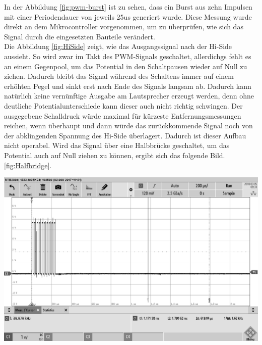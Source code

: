 In der Abbildung \ref{fig:pwm-burst} ist zu sehen, dass ein Burst aus zehn Impulsen mit einer Periodendauer von jeweils 25us generiert wurde. Diese Messung wurde direkt an dem Mikrocontroller vorgenommen, um zu überprüfen, wie sich das Signal durch die eingesetzten Bauteile verändert.\\
Die Abbildung \ref{fig:HiSide} zeigt, wie das Ausgangssignal nach der Hi-Side aussieht. So wird zwar im Takt des PWM-Signals geschaltet, allerdichgs fehlt es an einem Gegenpool, um das Potential in den Schaltpausen wieder auf Null zu ziehen. Dadurch bleibt das Signal während des Schaltens immer auf einem erhöhten Pegel und sinkt erst nach Ende des Signals langsam ab. Dadurch kann natürlich keine vernünftige Ausgabe am Lautsprecher erzeugt werden, denn ohne deutliche Potentialunterschiede kann dieser auch nicht richtig schwingen. Der ausgegebene Schalldruck würde maximal für kürzeste Entfernungsmessungen reichen, wenn überhaupt und dann würde das zurückkommende Signal noch von der abklingenden Spannung des Hi-Side überlagert. Dadurch ist dieser Aufbau nicht operabel.\newpage
Wird das Signal über eine Halbbrücke geschaltet, um das Potential auch auf Null ziehen zu können, ergibt sich das folgende Bild. \ref{fig:Halfbridge}.\\
\begin{minipage}{0.5\textwidth}
\includegraphics[width=1\textwidth, draft]{Abbildungen/PWM-Nach-der-Halbbrucke.png}
\label{fig:Halfbridge}
\end{minipage}
